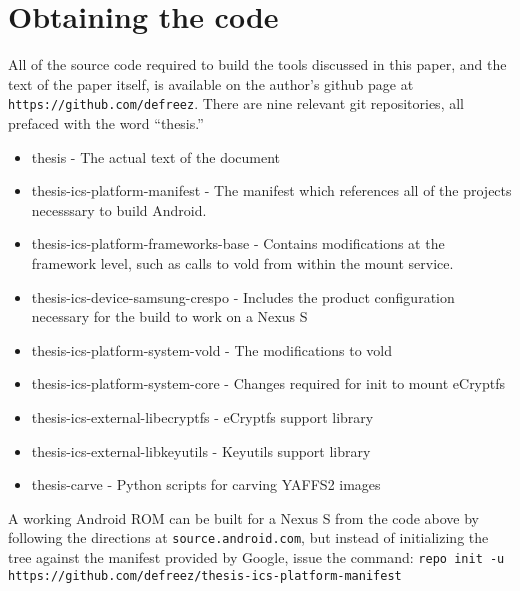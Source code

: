 \chapter{Obtaining the code}
\label{app:obtaincode}

All of the source code required to build the tools discussed in this paper, and the text of the paper itself,  is available on the author's github page at
\texttt{https://github.com/defreez}. There are nine relevant git repositories, all prefaced with the word ``thesis.''
\begin{itemize}
\item{thesis} - The actual text of the document
\item{thesis-ics-platform-manifest - The manifest which references all of the projects necesssary to build Android.}
\item{thesis-ics-platform-frameworks-base - Contains modifications at the framework level, such as calls to vold from within the
mount service.}
\item{thesis-ics-device-samsung-crespo - Includes the product configuration necessary for the build to work on a Nexus S}
\item{thesis-ics-platform-system-vold - The modifications to vold}
\item{thesis-ics-platform-system-core - Changes required for init to mount eCryptfs}
\item{thesis-ics-external-libecryptfs - eCryptfs support library}
\item{thesis-ics-external-libkeyutils - Keyutils support library}
\item{thesis-carve - Python scripts for carving YAFFS2 images}
\end{itemize}

A working Android ROM can be built for a Nexus S from the code above by following the directions at \texttt{source.android.com}, but
instead of initializing the tree against the manifest provided by Google, issue the command: \texttt{repo init -u
https://github.com/defreez/thesis-ics-platform-manifest}
